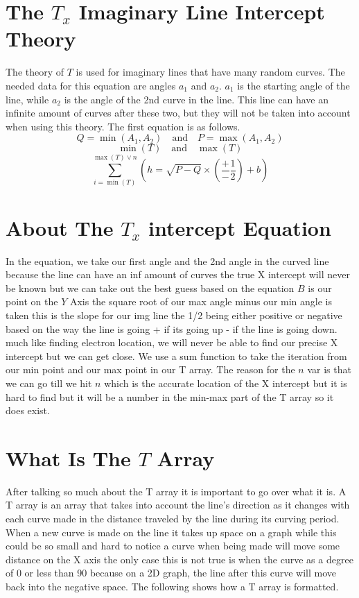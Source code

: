 \documentclass{article}
\begin{document}
\section{The \(T_x\) Imaginary Line Intercept Theory}
The theory of \(T\) is used for imaginary lines that have many random curves. The needed data for this equation are angles \(a_1\) and \(a_2\). \(a_1\) is the starting angle of the line, while \(a_2\) is the angle of the 2nd curve in the line. This line can have an infinite amount of curves after these two, but they will not be taken into account when using this theory. The first equation is as follows.
\[
Q = \min(A_1, A_2) \quad \text{and} \quad P = \max(A_1, A_2)
\]
\[
\min(T) \quad \text{and} \quad \max(T)
\]
\[
\sum_{i=\min(T)}^{\max(T) \vee n} \left( h = \sqrt{P - Q} \times \left( \frac{+}{-} \frac{1}{2} \right) + b \right)
\]

\section{About The \(T_x\) intercept Equation}
In the equation, we take our first angle and the 2nd angle in the curved line because the line can have an inf amount of curves the true X intercept will never be known but we can take out the best guess based on the equation \(B\) is our point on the \(Y\) Axis the square root of our max angle minus our min angle is taken this is the slope for our img line the 1/2 being either positive or negative based on the way the line is going + if its going up - if the line is going down. much like finding electron location, we will never be able to find our precise X intercept but we can get close. We use a sum function to take the iteration from our min point and our max point in our T array. The reason for the \(n\) var is that we can go till we hit \(n\) which is the accurate location of the X intercept but it is hard to find but it will be a number in the min-max part of the T array so it does exist. 
\section{What Is The \(T\) Array}

After talking so much about the T array it is important to go over what it is. A T array is an array that takes into account the line's direction as it changes with each curve made in the distance traveled by the line during its curving period. When a new curve is made on the line it takes up space on a graph while this could be so small and hard to notice a curve when being made will move some distance on the X axis the only case this is not true is when the curve as a degree of 0 or less than 90 because on a 2D graph, the line after this curve will move back into the negative space. The following shows how a T array is formatted.
\end{document}
